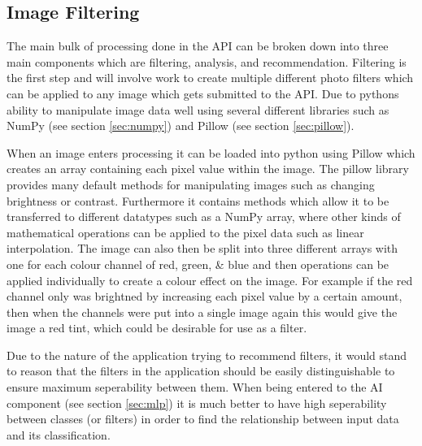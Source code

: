 \documentclass[a4paper,12pt]{report}
\begin{document}
    \subsection{Image Filtering}
      The main bulk of processing done in the API can be broken down into three main components which are filtering, analysis, and recommendation. Filtering is the first step and will involve work to create multiple different photo filters which can be applied to any image which gets submitted to the API. Due to pythons ability to manipulate image data well using several different libraries such as NumPy (see section \ref{sec:numpy}) and Pillow (see section \ref{sec:pillow}).

      When an image enters processing it can be loaded into python using Pillow which creates an array containing each pixel value within the image. The pillow library provides many default methods for manipulating images such as changing brightness or contrast. Furthermore it contains methods which allow it to be transferred to different datatypes such as a NumPy array, where other kinds of mathematical operations can be applied to the pixel data such as linear interpolation. The image can also then be split into three different arrays with one for each colour channel of red, green, \& blue and then operations can be applied individually to create a colour effect on the image. For example if the red channel only was brightned by increasing each pixel value by a certain amount, then when the channels were put into a single image again this would give the image a red tint, which could be desirable for use as a filter.

      Due to the nature of the application trying to recommend filters, it would stand to reason that the filters in the application should be easily distinguishable to ensure maximum seperability between them. When being entered to the AI component (see section \ref{sec:mlp}) it is much better to have high seperability between classes (or filters) in order to find the relationship between input data and its classification.
\end{document}
